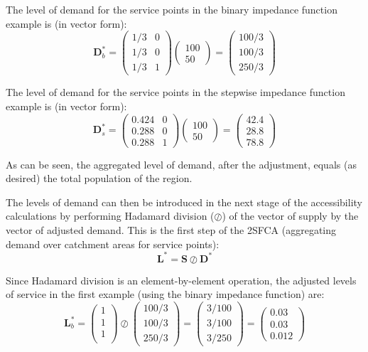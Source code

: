 \documentclass[10pt,letterpaper]{article}
\begin{document}
The level of demand for the service points in the binary impedance
function example is (in vector form): \[
\mathbf{D}^*_b= \left( \begin{array}{cc}
1/3 & 0\\
1/3 & 0\\
1/3 & 1\end{array} \right)
\left( \begin{array}{c}
100\\
50\end{array} \right)=
\left( \begin{array}{c}
100/3\\
100/3\\
250/3
\end{array} \right)
\]

The level of demand for the service points in the stepwise impedance
function example is (in vector form): \[
\mathbf{D}^*_s= \left( \begin{array}{cc}
0.424 & 0\\
0.288 & 0\\
0.288 & 1\end{array} \right)
\left( \begin{array}{c}
100\\
50\end{array} \right)=
\left( \begin{array}{c}
42.4\\
28.8\\
78.8
\end{array} \right)
\]

As can be seen, the aggregated level of demand, after the adjustment,
equals (as desired) the total population of the region.

The levels of demand can then be introduced in the next stage of the
accessibility calculations by performing Hadamard division (\(\oslash\))
of the vector of supply by the vector of adjusted demand. This is the
first step of the 2SFCA (aggregating demand over catchment areas for
service points): \[
\mathbf{L}^* = \mathbf{S}\oslash\mathbf{D}^*
\]

Since Hadamard division is an element-by-element operation, the adjusted
levels of service in the first example (using the binary impedance
function) are: \[
\mathbf{L}^*_b = \left( \begin{array}{c}
1 \\
1 \\
1 \\
\end{array}\right)\oslash
\left( \begin{array}{c}
100/3\\
100/3\\
250/3
\end{array} \right)=
\left( \begin{array}{c}
3/100\\
3/100\\
3/250
\end{array} \right)=
\left( \begin{array}{c}
0.03\\
0.03\\
0.012
\end{array} \right)
\]
\end{document}
